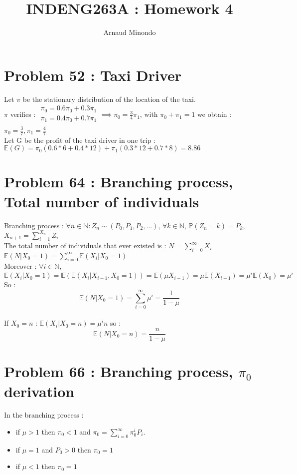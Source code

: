 \documentclass{article}
\title{INDENG263A : Homework 4}
\author{Arnaud Minondo}
\begin{document}
\maketitle

\section*{Problem 52 : Taxi Driver}
Let $\pi$ be the stationary distribution of the location of the taxi. 
\\
$\pi$ verifies : 
$ \begin{array}{c}
    \pi_0 = 0.6\pi_0 + 0.3\pi_1\\
    \pi_1 = 0.4\pi_0 +0.7\pi_1\\
\end{array} 
\implies \pi_0 = \frac{3}{4} \pi_1
$, with $\pi_0+\pi_1 = 1$ we obtain : $\pi_0 = \frac{3}{7}, \pi_1 = \frac{4}{7}$
\\
Let G be the profit of the taxi driver in one trip : $\mathbb{E}(G) = \pi_0(0.6*6+0.4*12) + \pi_1(0.3*12+0.7*8) = 8.86$
\section*{Problem 64 : Branching process, Total number of individuals}
Branching process : $\forall n\in\mathbb{N} : Z_n\sim(P_0,P_1,P_2,...)$, $\forall k \in \mathbb{N}$, $\mathbb{P}(Z_n=k) = P_k$, $X_{n+1} = \sum_{i=1}^{X_n}Z_i$
\\
The total number of individuals that ever existed is : $N=\sum_{i=0}^\infty X_i$
\\
$\mathbb{E}(N|X_0=1) = \sum_{i=0}^\infty\mathbb{E}(X_i|X_0=1)$\\
Moreover : $\forall i \in \mathbb{N}$, $\mathbb{E}(X_i|X_0=1) = \mathbb{E}(\mathbb{E}(X_i|X_{i-1},X_0=1)) = \mathbb{E}(\mu X_{i-1}) = \mu\mathbb{E}(X_{i-1}) = \mu^i\mathbb{E}(X_0) = \mu^i$
\\
So  : $$\boxed{\mathbb{E}(N|X_0=1) = \sum_{i=0}^\infty \mu^i = \frac{1}{1-\mu}}$$
\\
If $X_0 = n$ : $\mathbb{E}(X_i|X_0=n) = \mu^i n$ so : $$\boxed{\mathbb{E}(N|X_0=n) = \frac{n}{1-\mu}}$$
\section*{Problem 66 : Branching process, $\pi_0$ derivation}
In the branching process : \begin{itemize}
    \item if $\mu>1$ then $\pi_0<1$ and $\pi_0 = \sum_{i=0}^\infty \pi_0^iP_i$.
    \item if $\mu = 1$ and $P_0 > 0$ then $\pi_0 = 1$
    \item if $\mu<1$ then $\pi_0 = 1$
\end{itemize}
\end{document}

